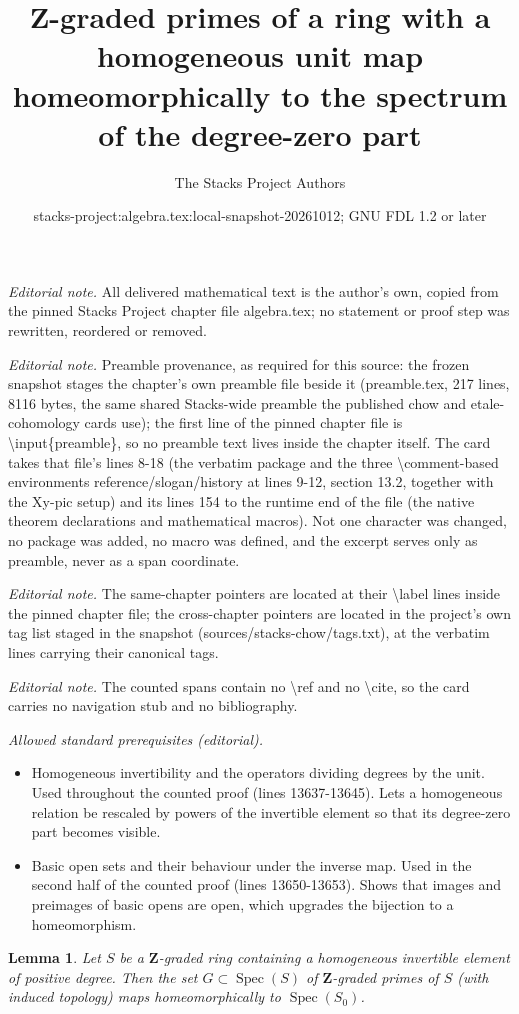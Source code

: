 \documentclass[10pt,a4paper]{amsart}
\title{Z-graded primes of a ring with a homogeneous unit map homeomorphically to the spectrum of the degree-zero part}
\author{The Stacks Project Authors}
\date{stacks-project:algebra.tex:local-snapshot-20261012; GNU FDL 1.2 or later}
\theoremstyle{plain}
\newtheorem{lemma}[subsection]{Lemma}
\theoremstyle{definition}
\theoremstyle{remark}
\numberwithin{equation}{subsection}
\def\Spec{\mathop{\mathrm{Spec}}}
\begin{document}
\maketitle
\noindent\textit{Editorial note.} All delivered mathematical text is the author's own, copied from the pinned Stacks Project chapter file algebra.tex; no statement or proof step was rewritten, reordered or removed.\par\medskip
\noindent\textit{Editorial note.} Preamble provenance, as required for this source: the frozen snapshot stages the chapter's own preamble file beside it (preamble.tex, 217 lines, 8116 bytes, the same shared Stacks-wide preamble the published chow and etale-cohomology cards use); the first line of the pinned chapter file is \textbackslash{}input\{preamble\}, so no preamble text lives inside the chapter itself. The card takes that file's lines 8-18 (the verbatim package and the three \textbackslash{}comment-based environments reference/slogan/history at lines 9-12, section 13.2, together with the Xy-pic setup) and its lines 154 to the runtime end of the file (the native theorem declarations and mathematical macros). Not one character was changed, no package was added, no macro was defined, and the excerpt serves only as preamble, never as a span coordinate.\par\medskip
\noindent\textit{Editorial note.} The same-chapter pointers are located at their \textbackslash{}label lines inside the pinned chapter file; the cross-chapter pointers are located in the project's own tag list staged in the snapshot (sources/stacks-chow/tags.txt), at the verbatim lines carrying their canonical tags.\par\medskip
\noindent\textit{Editorial note.} The counted spans contain no \textbackslash{}ref and no \textbackslash{}cite, so the card carries no navigation stub and no bibliography.\par\medskip
\noindent\textit{Allowed standard prerequisites (editorial).}\begin{itemize}
\item Homogeneous invertibility and the operators dividing degrees by the unit. Used throughout the counted proof (lines 13637-13645). Lets a homogeneous relation be rescaled by powers of the invertible element so that its degree-zero part becomes visible.
\item Basic open sets and their behaviour under the inverse map. Used in the second half of the counted proof (lines 13650-13653). Shows that images and preimages of basic opens are open, which upgrades the bijection to a homeomorphism.
\end{itemize}\medskip
\begin{lemma}
\label{lemma-Z-graded}
Let $S$ be a $\mathbf{Z}$-graded ring containing a homogeneous
invertible element of positive degree. Then the set
$G \subset \Spec(S)$ of $\mathbf{Z}$-graded primes of $S$
(with induced topology) maps homeomorphically to $\Spec(S_0)$.
\end{lemma}
\end{document}
